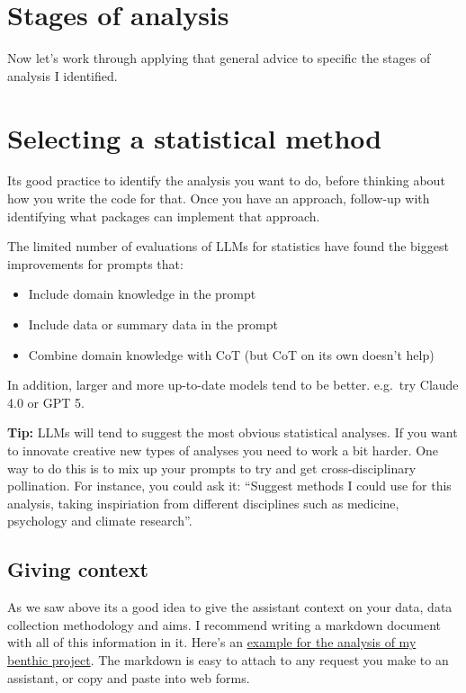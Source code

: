 \documentclass[
  letterpaper,
  DIV=11,
  numbers=noendperiod]{scrreprt}
\providecommand{\tightlist}{%
  \setlength{\itemsep}{0pt}\setlength{\parskip}{0pt}}\usepackage{longtable,booktabs,array}
\begin{document}
\section{Stages of analysis}\label{stages-of-analysis}

Now let's work through applying that general advice to specific the
stages of analysis I identified.

\section{Selecting a statistical
method}\label{selecting-a-statistical-method}

Its good practice to identify the analysis you want to do, before
thinking about how you write the code for that. Once you have an
approach, follow-up with identifying what packages can implement that
approach.

The limited number of evaluations of LLMs for statistics have found the
biggest improvements for prompts that:

\begin{itemize}
\tightlist
\item
  Include domain knowledge in the prompt
\item
  Include data or summary data in the prompt
\item
  Combine domain knowledge with CoT (but CoT on its own doesn't help)
\end{itemize}

In addition, larger and more up-to-date models tend to be better.
e.g.~try Claude 4.0 or GPT 5.

\textbf{Tip:} LLMs will tend to suggest the most obvious statistical
analyses. If you want to innovate creative new types of analyses you
need to work a bit harder. One way to do this is to mix up your prompts
to try and get cross-disciplinary pollination. For instance, you could
ask it: ``Suggest methods I could use for this analysis, taking
inspiriation from different disciplines such as medicine, psychology and
climate research''.

\subsection{Giving context}\label{giving-context}

As we saw above its a good idea to give the assistant context on your
data, data collection methodology and aims. I recommend writing a
markdown document with all of this information in it. Here's an
\href{link\%20TODO}{example for the analysis of my benthic project}. The
markdown is easy to attach to any request you make to an assistant, or
copy and paste into web forms.
\end{document}
